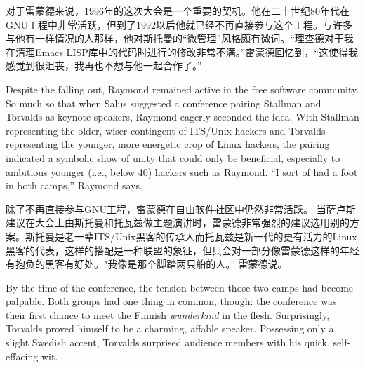 \ifdefined\chs
对于雷蒙德来说，1996年的这次大会是一个重要的契机。他在二十世纪80年代在GNU工程中非常活跃，但到了1992以后他就已经不再直接参与这个工程。与许多与他有一样情况的人那样，他对斯托曼的``微管理''风格颇有微词。``理查德对于我在清理Emacs LISP库中的代码时进行的修改非常不满。''雷蒙德回忆到，``这使得我感觉到很沮丧，我再也不想与他一起合作了。''
\fi

\ifdefined\eng
Despite the falling out, Raymond remained active in the free software community. So much so that when Salus suggested a conference pairing Stallman and Torvalds as keynote speakers, Raymond eagerly seconded the idea. With Stallman representing the older, wiser contingent of ITS/Unix hackers and Torvalds representing the younger, more energetic crop of Linux hackers, the pairing indicated a symbolic show of unity that could only be beneficial, especially to ambitious younger (i.e., below 40) hackers such as Raymond. ``I sort of had a foot in both camps,'' Raymond says.
\fi

\ifdefined\chs
除了不再直接参与GNU工程，雷蒙德在自由软件社区中仍然非常活跃。 当萨卢斯建议在大会上由斯托曼和托瓦兹做主题演讲时，雷蒙德非常强烈的建议选用别的方案。斯托曼是老一辈ITS/Unix黑客的传承人而托瓦兹是新一代的更有活力的Linux黑客的代表，这样的搭配是一种联盟的象征，但只会对一部分像雷蒙德这样的年经有抱负的黑客有好处。"我像是那个脚踏两只船的人。'' 雷蒙德说。
\fi

\ifdefined\eng
By the time of the conference, the tension between those two camps had become palpable. Both groups had one thing in common, though: the conference was their first chance to meet the Finnish \textit{wunderkind} in the flesh. Surprisingly, Torvalds proved himself to be a charming, affable speaker. Possessing only a slight Swedish accent, Torvalds surprised audience members with his quick, self-effacing wit.
\fi


